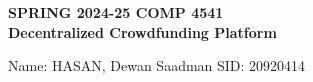 \documentclass[12pt,reqno]{article}
\newcommand{\np}{\newpage}
\newcommand{\tab}{\;\;\;\;\;\;}
\begin{document}




\vspace*{\fill}
\begin{center}
    \begin{huge}
        \textbf{SPRING 2024-25 COMP 4541} \\
        \vspace{0.5cm}
        \textbf{Decentralized Crowdfunding Platform} \\
    \end{huge}
    \vspace{0.5cm}
    Name: HASAN, Dewan Saadman \tab \tab SID: 20920414
\end{center}
\vspace*{\fill}


\np
\tableofcontents


\np
{}
\end{document}
